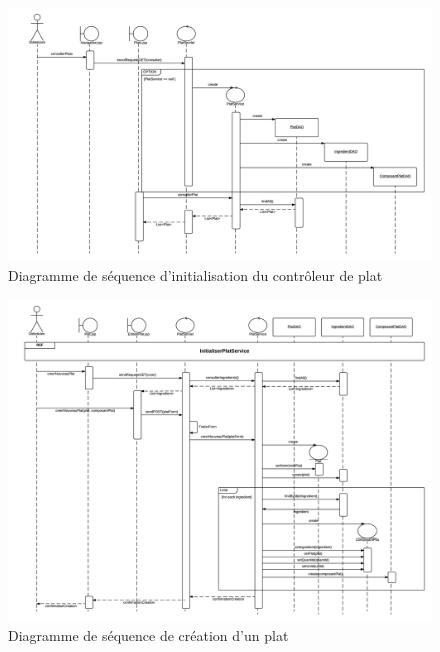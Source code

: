 \begin{figure}
\centering
\includegraphics[scale=0.45]{../../CasDUtilisations/CompositionPlat/sequence_InitialisationPlatControleur.png}
\caption{Diagramme de séquence d'initialisation du contrôleur de plat}
\label{SequenceInitPlatControleur}
\end{figure}

\begin{figure}
\centering
\includegraphics[scale=0.45]{../../CasDUtilisations/CompositionPlat/sequence_CreerPlat.png}
\caption{Diagramme de séquence de création d'un plat}
\label{SequenceCreerPlat}
\end{figure}

